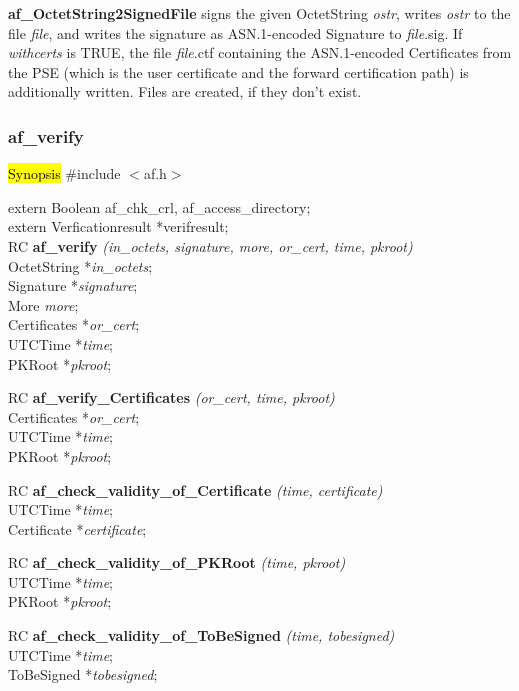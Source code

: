 {\bf af\_OctetString2SignedFile} signs the given OctetString {\em ostr}, writes {\em ostr}
to the file {\em file}, and writes the signature as ASN.1-encoded Signature to {\em file}.sig.
If {\em withcerts} is TRUE, the file {\em file}.ctf containing the ASN.1-encoded Certificates
from the PSE (which is the user certificate and the forward certification path) is additionally
written. Files are created, if they don't exist.

\subsubsection{af\_verify}
\label{af_verify}
\hl{Synopsis}
\#include $<$af.h$>$ 

extern Boolean af\_chk\_crl, af\_access\_directory; \\
extern Verficationresult *verifresult; \\ [1em]
RC {\bf af\_verify} {\em (in\_octets, signature, more, or\_cert, time, pkroot)} \\
OctetString *{\em in\_octets}; \\
Signature *{\em signature}; \\
More {\em more}; \\
Certificates *{\em or\_cert}; \\
UTCTime *{\em time}; \\
PKRoot *{\em pkroot};

RC {\bf af\_verify\_Certificates} {\em (or\_cert, time, pkroot)} \\
Certificates *{\em or\_cert}; \\
UTCTime *{\em time}; \\
PKRoot *{\em pkroot};

RC {\bf af\_check\_validity\_of\_Certificate} {\em (time, certificate)} \\
UTCTime *{\em time}; \\
Certificate *{\em certificate};

RC {\bf af\_check\_validity\_of\_PKRoot} {\em (time, pkroot)} \\
UTCTime *{\em time}; \\
PKRoot *{\em pkroot};

RC {\bf af\_check\_validity\_of\_ToBeSigned} {\em (time, tobesigned)} \\
UTCTime *{\em time}; \\
ToBeSigned *{\em tobesigned};

